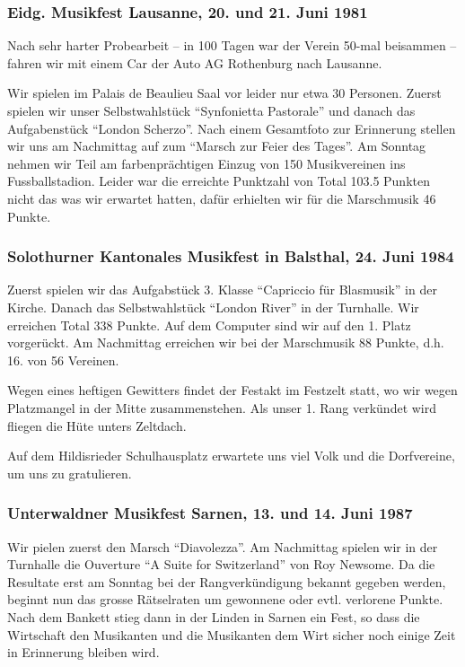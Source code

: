 \begin{history}
    \subsubsection*{Eidg. Musikfest Lausanne,  20. und 21. Juni 1981}

    Nach sehr harter Probearbeit -- in 100 Tagen war der Verein 50-mal beisammen
    -- fahren wir mit einem Car der Auto AG Rothenburg nach Lausanne.

    Wir spielen im Palais de Beaulieu Saal vor leider nur etwa 30 Personen.
    Zuerst spielen wir unser Selbstwahlstück \enquote{Synfonietta Pastorale} und
    danach das Aufgabenstück \enquote{London Scherzo}. Nach einem Gesamtfoto zur
    Erinnerung stellen wir uns am Nachmittag auf zum \enquote{Marsch zur Feier
        des Tages}. Am Sonntag nehmen wir Teil am farbenprächtigen Einzug von 150
    Musikvereinen ins Fussballstadion. Leider war die erreichte Punktzahl von
    Total 103.5 Punkten nicht das was wir erwartet hatten, dafür erhielten wir
    für die Marschmusik 46 Punkte.


    \subsubsection*{Solothurner Kantonales Musikfest in Balsthal, 24. Juni 1984}

    Zuerst spielen wir das Aufgabstück 3. Klasse \enquote{Capriccio für
        Blasmusik} in der Kirche. Danach das Selbstwahlstück \enquote{London
        River} in der Turnhalle. Wir erreichen Total 338 Punkte. Auf dem
    Computer sind wir auf den 1. Platz vorgerückt. Am Nachmittag erreichen
    wir bei der Marschmusik 88 Punkte, d.h. 16. von 56 Vereinen.

    Wegen eines heftigen Gewitters findet der Festakt im Festzelt statt, wo wir
    wegen Platzmangel in der Mitte zusammenstehen. Als unser 1. Rang verkündet
    wird fliegen die Hüte unters Zeltdach.

    Auf dem Hildisrieder Schulhausplatz erwartete uns viel Volk und die
    Dorfvereine, um uns zu gratulieren.


    \subsubsection*{Unterwaldner Musikfest Sarnen, 13. und 14. Juni 1987}

    Wir pielen zuerst den Marsch \enquote{Diavolezza}. Am Nachmittag spielen wir
    in der Turnhalle die Ouverture \enquote{A Suite for Switzerland} von Roy
    Newsome. Da die Resultate erst am Sonntag bei der Rangverkündigung bekannt
    gegeben werden, beginnt nun das grosse Rätselraten um gewonnene oder evtl.
    verlorene Punkte. Nach dem Bankett stieg dann in der Linden in Sarnen ein
    Fest, so dass die Wirtschaft den Musikanten und die Musikanten dem Wirt
    sicher noch einige Zeit in Erinnerung bleiben wird.


\end{history}
